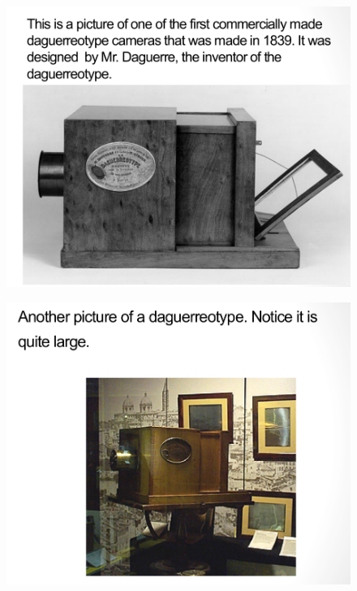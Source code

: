 \documentclass{beamer}
\begin{document}
\begin{frame}
	\begin{figure}
		\centering
		\includegraphics[scale=0.4]{83.jpg}
	\end{figure}
\end{frame}

\begin{frame}
	\begin{figure}
		\centering
		\includegraphics[scale=0.4]{84.jpg}
	\end{figure}
\end{frame}
\end{document}
